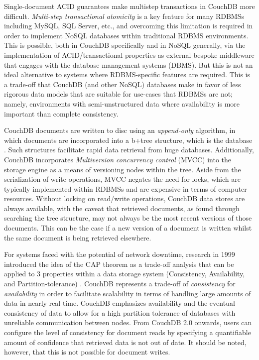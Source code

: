 Single-document ACID guarantees make multistep transactions in CouchDB more difficult. \textit{Multi-step transactional atomicity} is a key feature for many RDBMSs including MySQL, SQL Server, etc., and overcoming this limitation is required in order to implement NoSQL databases within traditional RDBMS environments. This is possible, both in CouchDB specifically \cite{Rashmi2017} and in NoSQL generally, \cite{LOTFY2016133} via the implementation of ACID/transactional properties as external bespoke middleware that engages with the database management systems (DBMS). But this is not an ideal alternative to systems where RDBMS-specific features are required. This is a trade-off that CouchDB (and other NoSQL) databases make in favor of less rigorous data models that are suitable for use-cases that RDBMSs are not; namely, environments with semi-unstructured data where availability is more important than complete consistency.

CouchDB documents are written to disc using an \textit{append-only} algorithm, in which documents are incorporated into a b+tree structure, which is the database \cite{couchguide}. Such structures facilitate rapid data retrieval from huge databases. Additionally, CouchDB incorporates \textit{Multiversion concurrency control} (MVCC) into the storage engine as a means of versioning nodes within the tree. Aside from the serialization of write operations, MVCC negates the need for locks, which are typically implemented within RDBMSs and are expensive in terms of computer resources. Without locking on read/write operations, CouchDB data stores are always available, with the caveat that retrieved documents, as found through searching the tree structure, may not always be the most recent versions of those documents. This can be the case if a new version of a document is written whilst the same document is being retrieved elsewhere.

For systems faced with the potential of network downtime, research in 1999 introduced the idea of the CAP theorem as a trade-off analysis that can be applied to 3 properties within a data storage system (Consistency, Availability, and Partition-tolerance) \cite{cap}. CouchDB represents a trade-off of \textit{consistency} for \textit{availability} in order to facilitate scalability in terms of handling large amounts of data in nearly real time. CouchDB emphasizes availability and the eventual consistency of data to allow for a high partition tolerance of databases with unreliable communication between nodes. From CouchDB 2.0 onwards, users can configure the level of consistency for document reads by specifying a quantifiable amount of confidence that retrieved data is not out of date. It should be noted, however, that this is not possible for document writes.

